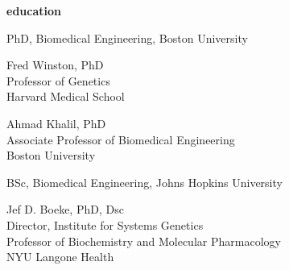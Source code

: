 \documentclass[11pt, a4paper]{article}
\begin{document}
\vspace{2em}
\textbf{\Large education}
\begin{description}[topsep=2pt, align=right, leftmargin=!, labelwidth=\widthof{\textbf{2019}}]
    \item [2019] PhD, Biomedical Engineering, Boston University
        \begin{description}[topsep=0pt, align=right, leftmargin=!, labelwidth=\widthof{research advisor:}, font=\normalfont]
            \item [research advisor:] Fred Winston, PhD \\ Professor of Genetics \\ Harvard Medical School
            \item [co-advisor:] Ahmad Khalil, PhD \\ Associate Professor of Biomedical Engineering \\ Boston University
        \end{description}
    \item [2013] BSc, Biomedical Engineering, Johns Hopkins University
        \begin{description}[topsep=0pt, align=right, leftmargin=!, labelwidth=\widthof{research advisor:}, font=\normalfont]
            \item [research advisor:] Jef D. Boeke, PhD, Dsc \\ Director, Institute for Systems Genetics \\ Professor of Biochemistry and Molecular Pharmacology \\ NYU Langone Health
        \end{description}
\end{description}
\end{document}
